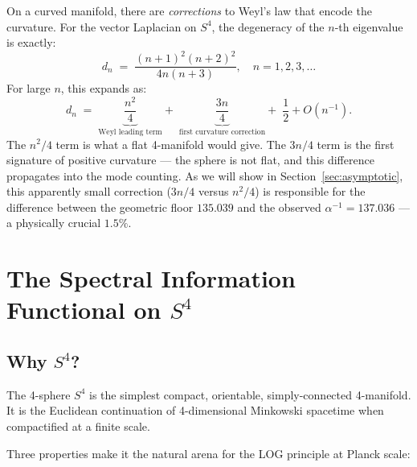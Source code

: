 \documentclass[12pt,a4paper]{article}
\begin{document}
On a curved manifold, there are \emph{corrections} to
Weyl's law that encode the curvature.
For the vector Laplacian on $S^4$, the degeneracy
of the $n$-th eigenvalue is exactly:
\begin{equation}
  d_n \;=\; \frac{(n+1)^2(n+2)^2}{4n(n+3)},
  \quad n = 1, 2, 3, \ldots
\label{eq:dn_exact}
\end{equation}
For large $n$, this expands as:
\begin{equation}
  d_n \;=\;
  \underbrace{\frac{n^2}{4}}_{\text{Weyl leading term}}
  +\;
  \underbrace{\frac{3n}{4}}_{\text{first curvature correction}}
  +\; \frac{1}{2} + O(n^{-1}).
\label{eq:dn_expand}
\end{equation}
The $n^2/4$ term is what a flat 4-manifold would give.
The $3n/4$ term is the first signature of positive
curvature --- the sphere is not flat, and this
difference propagates into the mode counting.
As we will show in Section~\ref{sec:asymptotic},
this apparently small correction ($3n/4$ versus $n^2/4$)
is responsible for the difference between the
geometric floor $135.039$ and the observed
$\alpha^{-1} = 137.036$ --- a physically crucial $1.5\%$.

\section{The Spectral Information Functional on $S^4$}
\label{sec:spectral}

\subsection{Why $S^4$?}
\label{sec:whyS4}

The 4-sphere $S^4$ is the simplest compact, orientable,
simply-connected 4-manifold.
It is the Euclidean continuation of 4-dimensional
Minkowski spacetime when compactified at a finite scale.

Three properties make it the natural arena for
the LOG principle at Planck scale:
\end{document}
